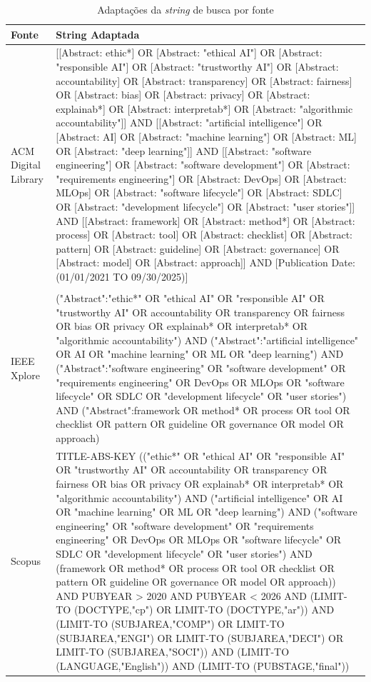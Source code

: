 \begin{table}[htbp]
 \centering
 \caption{Adaptações da \textit{string} de busca por fonte}
 \label{tab:strings}
 \scriptsize
 \begin{tabular}{p{1.5cm}p{12.5cm}}
    \hline
    \textbf{Fonte} & \textbf{String Adaptada} \\
    \hline
    \addlinespace
    ACM Digital Library & [[Abstract: ethic*] OR [Abstract: "ethical AI"] OR [Abstract: "responsible AI"] OR [Abstract: "trustworthy AI"] OR [Abstract: accountability] OR [Abstract: transparency] OR [Abstract: fairness] OR [Abstract: bias] OR [Abstract: privacy] OR [Abstract: explainab*] OR [Abstract: interpretab*] OR [Abstract: "algorithmic accountability"]] AND [[Abstract: "artificial intelligence"] OR [Abstract: AI] OR [Abstract: "machine learning"] OR [Abstract: ML] OR [Abstract: "deep learning"]] AND [[Abstract: "software engineering"] OR [Abstract: "software development"] OR [Abstract: "requirements engineering"] OR [Abstract: DevOps] OR [Abstract: MLOps] OR [Abstract: "software lifecycle"] OR [Abstract: SDLC] OR [Abstract: "development lifecycle"] OR [Abstract: "user stories"]] AND [[Abstract: framework] OR [Abstract: method*] OR [Abstract: process] OR [Abstract: tool] OR [Abstract: checklist] OR [Abstract: pattern] OR [Abstract: guideline] OR [Abstract: governance] OR [Abstract: model] OR [Abstract: approach]] AND [Publication Date: (01/01/2021 TO 09/30/2025)] \\
     \\
    \hline
    \addlinespace
    IEEE Xplore & ("Abstract":"ethic*" OR "ethical AI" OR "responsible AI" OR "trustworthy AI" OR accountability OR transparency OR fairness OR bias OR privacy OR explainab* OR interpretab* OR "algorithmic accountability") AND ("Abstract":"artificial intelligence" OR AI OR "machine learning" OR ML OR "deep learning") AND ("Abstract":"software engineering" OR "software development" OR "requirements engineering" OR DevOps OR MLOps OR "software lifecycle" OR SDLC OR "development lifecycle" OR "user stories") AND ("Abstract":framework OR method* OR process OR tool OR checklist OR pattern OR guideline OR governance OR model OR approach) \\
    \hline
    \addlinespace
    Scopus & TITLE-ABS-KEY (("ethic*" OR "ethical AI" OR "responsible AI" OR "trustworthy AI" OR accountability OR transparency OR fairness OR bias OR privacy OR explainab* OR interpretab* OR "algorithmic accountability") AND ("artificial intelligence" OR AI OR "machine learning" OR ML OR "deep learning") AND ("software engineering" OR "software development" OR "requirements engineering" OR DevOps OR MLOps OR "software lifecycle" OR SDLC OR "development lifecycle" OR "user stories") AND (framework OR method* OR process OR tool OR checklist OR pattern OR guideline OR governance OR model OR approach)) AND PUBYEAR > 2020 AND PUBYEAR < 2026 AND (LIMIT-TO (DOCTYPE,"cp") OR LIMIT-TO (DOCTYPE,"ar")) AND (LIMIT-TO (SUBJAREA,"COMP") OR LIMIT-TO (SUBJAREA,"ENGI") OR LIMIT-TO (SUBJAREA,"DECI") OR LIMIT-TO (SUBJAREA,"SOCI")) AND (LIMIT-TO (LANGUAGE,"English")) AND (LIMIT-TO (PUBSTAGE,"final")) \\

\end{tabular}
\end{table}
